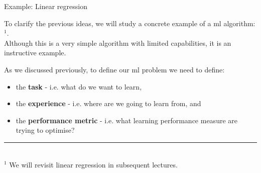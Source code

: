 
%
%
%

\begin{frame}[t]{Example: Linear regression}

    To clarify the previous ideas, 
    we will study a concrete example
    of a \gls{ml} algorithm: 
    $^{1}$.\\
    \vspace{0.2cm}
    Although this is a very simple algorithm with limited capabilities,
    it is an instructive example.\\
    \vspace{0.2cm}

    As we discussed previously, 
    to define our \gls{ml} problem we need to define:\\
    \vspace{0.1cm}

    \begin{itemize}
        \item 
        the {\bf task} - 
        i.e. what do we want to learn,\\
        \vspace{0.1cm}
        \item 
        the {\bf experience} - 
        i.e. where are we going to learn from, and\\
        \vspace{0.1cm}
        \item 
        the {\bf performance metric} - 
        i.e. what learning performance measure are trying to optimise?\\
    \end{itemize}

    \vspace{0.2cm}
    \noindent\rule{4cm}{0.4pt}\\
    {\scriptsize
      $^{1}$ We will revisit \gls{linear regression}
      in subsequent lectures.\\
    }

\end{frame}

%
%
%

